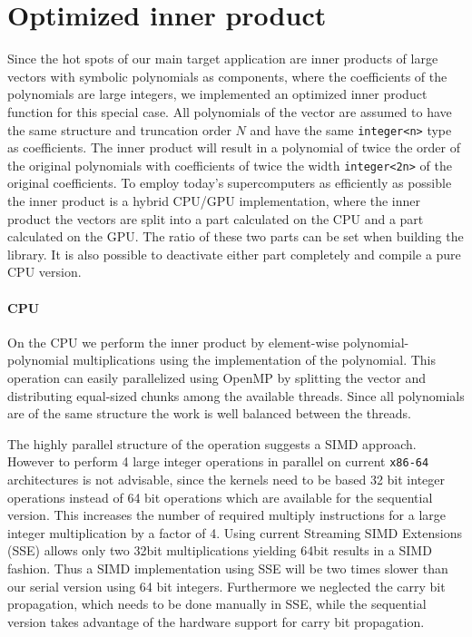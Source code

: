 \documentclass[oribibl]{llncs2e/llncs}
\begin{document}
\section{Optimized inner product}
Since the hot spots of our main target application are inner products of large vectors with symbolic polynomials as components, where the coefficients of the polynomials are large integers, we implemented an optimized inner product function for this special case.
All polynomials of the vector are assumed to have the same structure and truncation order $N$ and have the same \verb|integer<n>| type as coefficients.
The inner product will result in a polynomial of twice the order of the original polynomials with coefficients of twice the width \verb|integer<2n>| of the original coefficients.
To employ today's supercomputers as efficiently as possible the inner product is a hybrid CPU/GPU implementation,
where the inner product the vectors are split into a part calculated on the CPU and a part calculated on the GPU.
The ratio of these two parts can be set when building the library.
It is also possible to deactivate either part completely and compile a pure CPU version.

\paragraph{CPU}
On the CPU we perform the inner product by element-wise polynomial-polynomial multiplications using the implementation of the polynomial.
This operation can easily parallelized using OpenMP by splitting the vector and distributing equal-sized chunks among the available threads.
Since all polynomials are of the same structure the work is well balanced between the threads.

The highly parallel structure of the operation suggests a SIMD approach.
However to perform 4 large integer operations in parallel on current \verb|x86-64| architectures is not advisable,
since the kernels need to be based 32 bit integer operations instead of 64 bit operations which are available for the sequential version.
This increases the number of required multiply instructions for a large integer multiplication by a factor of 4.
Using current Streaming SIMD Extensions (SSE) allows only two 32bit multiplications yielding 64bit results in a SIMD fashion.
Thus a SIMD implementation using SSE will be two times slower than our serial version using 64 bit integers.
Furthermore we neglected the carry bit propagation, which needs to be done manually in SSE,
while the sequential version takes advantage of the hardware support for carry bit propagation.
\end{document}
